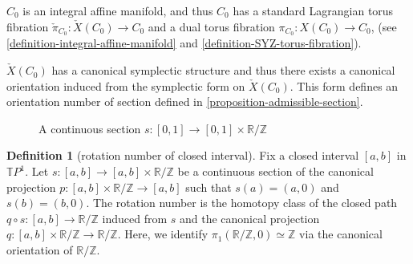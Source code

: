 \documentclass[a4paper,dvipdfmx,reqno,12pt]{amsart}
\theoremstyle{definition}
\newtheorem{definition}[theorem]{Definition}
\numberwithin{equation}{section}
\begin{document}
$C_0$ is an integral affine manifold, 
and thus $C_0$ has a standard Lagrangian torus fibration
$\check{\pi}_{C_0}\colon \check{X}(C_0)\to C_0$ and
a dual torus fibration 
$\pi_{C_0}\colon X(C_0)\to C_0$,
(see \cref{definition-integral-affine-manifold}
and \cref{definition-SYZ-torus-fibration}).

$\check{X}(C_0)$ has a canonical symplectic structure
and thus there exists a canonical orientation induced
from the symplectic form on $\check{X}(C_0)$.
This form defines an orientation number of 
section defined in \cref{proposition-admissible-section}.


\begin{figure}
  \centering

\caption{A continuous section $s\colon [0,1]\to [0,1]\times \mathbb{R}/\mathbb{Z}$}
\end{figure}

\begin{definition}[{rotation number of closed interval}]
Fix a closed interval $[a,b]$ in $\mathbb{T}P^{1}$.
Let $s\colon [a,b]\to [a,b]\times \mathbb{R}/\mathbb{Z}$ be 
a continuous section of the canonical projection
$p\colon [a,b]\times \mathbb{R}/\mathbb{Z} \to [a,b]$
such that $s(a)=(a,0)$ and $s(b)=(b,0)$. 
The rotation number
is the homotopy class of the closed path
$q\circ s\colon [a,b]\to \mathbb{R}/\mathbb{Z}$
induced from $s$ and the canonical projection
$q\colon [a,b]\times \mathbb{R}/\mathbb{Z} 
\to \mathbb{R}/\mathbb{Z}$. Here, 
we identify $\pi_1(\mathbb{R}/\mathbb{Z},0)\simeq \mathbb{Z}$
via the canonical orientation of $\mathbb{R}/\mathbb{Z}$.
\end{definition}
\end{document}
